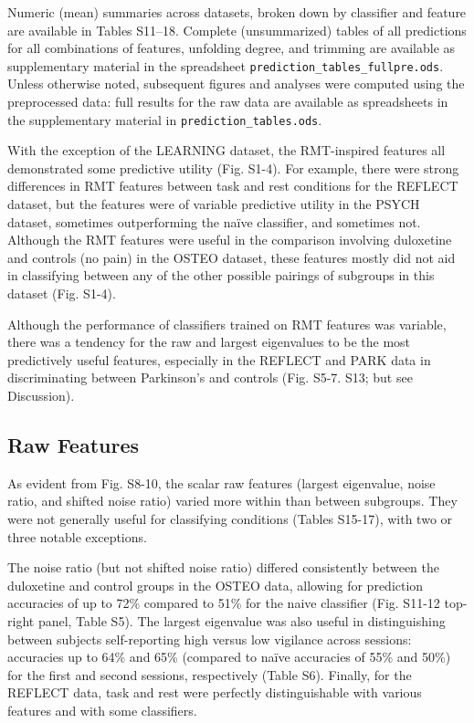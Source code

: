 Numeric (mean) summaries across datasets, broken down by classifier and feature are available in
Tables S11--18. Complete (unsummarized) tables of all predictions for all combinations of features,
unfolding degree, and trimming are available as supplementary material in the spreadsheet
\texttt{prediction\_tables\_fullpre.ods}. Unless otherwise noted, subsequent figures and analyses were
computed using the preprocessed data: full results for the raw data are available as spreadsheets in
the supplementary material in \texttt{prediction\_tables.ods}.

With the exception of the LEARNING dataset, the RMT-inspired features all demonstrated some
predictive utility (Fig. S1-4). For example, there were strong differences in RMT features between
task and rest conditions for the REFLECT dataset, but the features were of variable predictive
utility in the PSYCH dataset, sometimes outperforming the naïve classifier, and sometimes not.
Although the RMT features were useful in the comparison involving duloxetine and controls (no pain)
in the OSTEO dataset, these features mostly did not aid in classifying between any of the other
possible pairings of subgroups in this dataset (Fig. S1-4).

Although the performance of classifiers trained on RMT features was variable, there was a tendency
for the raw and largest eigenvalues to be the most predictively useful features, especially in the
REFLECT and PARK data in discriminating between Parkinson's and controls (Fig. S5-7. S13; but see
Discussion).

\subsection{Raw Features}
As evident from Fig. S8-10, the scalar raw features (largest eigenvalue, noise ratio, and shifted
noise ratio) varied more within than between subgroups. They were not generally useful for
classifying conditions (Tables S15-17), with two or three notable exceptions.

The noise ratio (but not shifted noise ratio) differed consistently between the duloxetine and
control groups in the OSTEO data, allowing for prediction accuracies of up to 72\% compared to 51\%
for the naive classifier (Fig. S11-12 top-right panel, Table S5). The largest eigenvalue was also
useful in distinguishing between subjects self-reporting high versus low vigilance across sessions:
accuracies up to 64\% and 65\% (compared to naïve accuracies of 55\% and 50\%) for the first and
second sessions, respectively (Table S6). Finally, for the REFLECT data, task and rest were
perfectly distinguishable with various features and with some classifiers.

